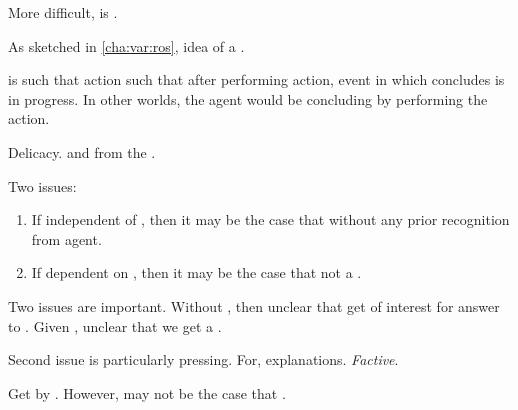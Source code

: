 \begin{note}
  More difficult, is \ros{}.

  As sketched in \autoref{cha:var:ros}, idea of a \fc{}.
\end{note}

\begin{note}
  \fc{} is such that action such that after performing action, event in which concludes is in progress.
  In other worlds, the agent would be concluding by performing the action.

  Delicacy.
   and \ros{} from the \agpe{}.

  Two issues:

  \begin{enumerate}
  \item
    If independent of \agpe{}, then it may be the case that \fc{} without any prior recognition from agent.
  \item
    If dependent on \agpe{}, then it may be the case that not a \fc{}.
  \end{enumerate}

  Two issues are important.
  Without \agpe{}, then unclear that get \ros{} of interest for answer to \qWhyVnP{}.
  Given \agpe{}, unclear that we get a \ros{}.
\end{note}

\begin{note}
  Second issue is particularly pressing.
  For, explanations.
  \emph{Factive}.

  Get \ros{} by \fc{}.
  However, may not be the case that \fc{}.
\end{note}

